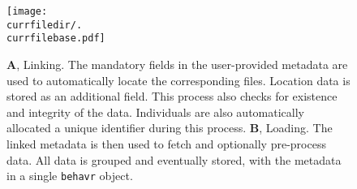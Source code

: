 \begin{figure}[h!]
	\centering   
	\texttt{[image: \\currfiledir/.\\currfilebase.pdf]}
	  \caption[Linking and loading]{
\textbf{A}, Linking. The mandatory fields in the user-provided metadata are used to automatically locate the corresponding files.
Location data is stored as an additional field. This process also checks for existence and  integrity of the data.
Individuals are also automatically allocated a unique identifier during this process.
\textbf{B}, Loading. 
The linked metadata is then used to fetch and optionally pre-process data.
All data is grouped and eventually stored, with the metadata in a single \texttt{behavr} object.
\label{fig:\currfilebase}
}
\end{figure}
